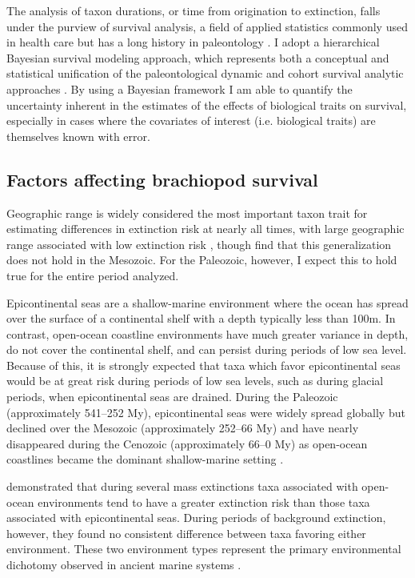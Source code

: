 \documentclass{article}
\begin{document}
The analysis of taxon durations, or time from origination to extinction, falls under the purview of survival analysis, a field of applied statistics commonly used in health care \citep{Klein2003} but has a long history in paleontology \citep{Simpson1944,Simpson1953,VanValen1973,VanValen1979}. I adopt a hierarchical Bayesian survival modeling approach, which represents both a conceptual and statistical unification of the paleontological dynamic and cohort survival analytic approaches \citep{VanValen1973,VanValen1979,Raup1978,Raup1975,Foote1988,Baumiller1993,Simpson2006}. By using a Bayesian framework I am able to quantify the uncertainty inherent in the estimates of the effects of biological traits on survival, especially in cases where the covariates of interest (i.e. biological traits) are themselves known with error. 

\subsection{Factors affecting brachiopod survival}

Geographic range is widely considered the most important taxon trait for estimating differences in extinction risk at nearly all times, with large geographic range associated with low extinction risk \citep{Jablonski1986,Jablonski1987,Jablonski2003,Payne2007}, though \citet{Foote2013} find that this generalization does not hold in the Mesozoic. For the Paleozoic, however, I expect this to hold true for the entire period analyzed.

Epicontinental seas are a shallow-marine environment where the ocean has spread over the surface of a continental shelf with a depth typically less than 100m. In contrast, open-ocean coastline environments have much greater variance in depth, do not cover the continental shelf, and can persist during periods of low sea level. Because of this, it is strongly expected that taxa which favor epicontinental seas would be at great risk during periods of low sea levels, such as during glacial periods, when epicontinental seas are drained. During the Paleozoic (approximately 541--252 My), epicontinental seas were widely spread globally but declined over the Mesozoic (approximately 252--66 My) and have nearly disappeared during the Cenozoic (approximately 66--0 My) as open-ocean coastlines became the dominant shallow-marine setting \citep{Peters2008,Miller2009a,Johnson1974}. 

\citet{Miller2009a} demonstrated that during several mass extinctions taxa associated with open-ocean environments tend to have a greater extinction risk than those taxa associated with epicontinental seas. During periods of background extinction, however, they found no consistent difference between taxa favoring either environment. These two environment types represent the primary environmental dichotomy observed in ancient marine systems \citep{Miller2009a,Peters2008,Sheehan2001b}. 
\end{document}
